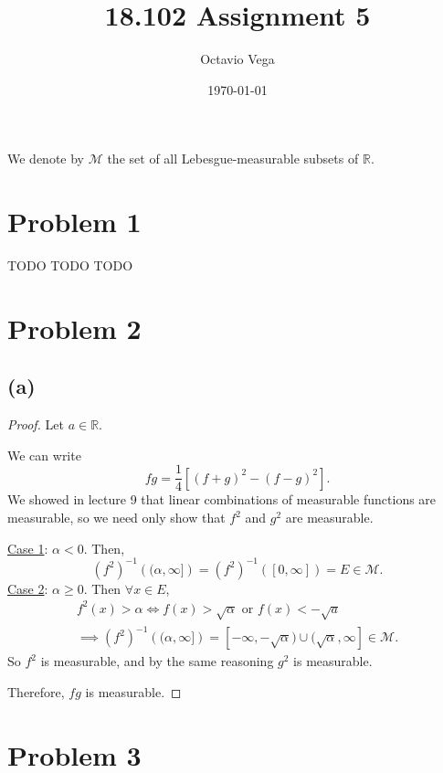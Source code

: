 \documentclass{article}
\title{18.102 Assignment 5}
\author{Octavio Vega}
\date\today
\newcommand{\R}{\mathbb{R}} %
\newcommand{\M}{\mathcal{M}} %
\begin{document}
\maketitle

We denote by $\M$ the set of all Lebesgue-measurable subsets of $\R$.

\section*{Problem 1}
TODO TODO TODO
\section*{Problem 2}
\subsection*{(a)}
\begin{proof}
	Let $a \in \R$.
	
	We can write
	\begin{equation}
		fg = \frac{1}{4}\left[(f+g)^2 - (f-g)^2\right].
	\end{equation}
	We showed in lecture 9 that linear combinations of measurable functions are measurable, so we need only show that $f^2$ and $g^2$ are measurable.
	
	\underline{Case 1}: $\alpha < 0$. Then,
	\begin{equation}
		(f^2)^{-1}\left((\alpha, \infty]\right) = (f^2)^{-1}\left([0,\infty]\right) = E \in \M.
	\end{equation}
	\underline{Case 2}: $\alpha \geq 0$. Then $\forall x \in E$,
	\begin{align}
		f^2(x) > \alpha \iff f(x) > \sqrt{\alpha} \textrm{ or } f(x) < -\sqrt{a} \\
		\implies (f^2)^{-1}\left((\alpha, \infty]\right) = [-\infty, -\sqrt{\alpha}) \cup (\sqrt{\alpha}, \infty] \in \M.
	\end{align}
	So $f^2$ is measurable, and by the same reasoning $g^2$ is measurable.
	
	Therefore, $fg$ is measurable.
\end{proof}

\section*{Problem 3}
\end{document}
